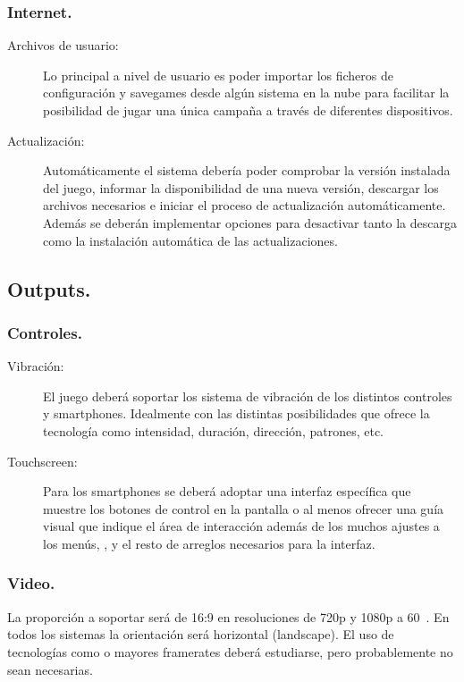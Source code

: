 \subsubsection{Internet.}
\begin{description}
\item[Archivos de usuario:] Lo principal a nivel de usuario es poder importar los ficheros de configuración y savegames desde algún sistema en la nube para facilitar la posibilidad de jugar una única campaña a través de diferentes dispositivos.

\item[Actualización:] Automáticamente el sistema debería poder comprobar la versión instalada del juego, informar la disponibilidad de una nueva versión, descargar los archivos necesarios e iniciar el proceso de actualización automáticamente. Además se deberán implementar opciones para desactivar tanto la descarga como la instalación automática de las actualizaciones.
\end{description}

\subsection{Outputs.}

\subsubsection{Controles.}
\begin{description}
\item[Vibración:] El juego deberá soportar los sistema de vibración de los distintos controles y smartphones. Idealmente con las distintas posibilidades que ofrece la tecnología como intensidad, duración, dirección, patrones, etc.

\item[Touchscreen:] Para los smartphones se deberá adoptar una interfaz específica que muestre los botones de control en la pantalla o al menos ofrecer una guía visual que indique el área de interacción además de los muchos ajustes a los menús, , y el resto de arreglos necesarios para la interfaz.
\end{description}

\subsubsection{Video.}
La proporción a soportar será de 16:9 en resoluciones de 720p y 1080p a 60~. En todos los sistemas la orientación será horizontal (landscape). El uso de tecnologías como  o mayores framerates deberá estudiarse, pero probablemente no sean necesarias.


